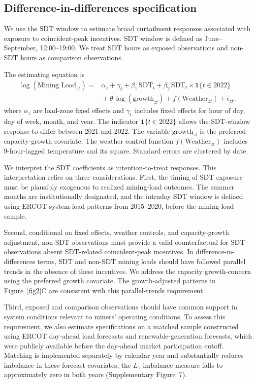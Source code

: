 \documentclass[pdflatex,sn-mathphys-num]{sn-jnl}%
\theoremstyle{thmstyleone}%
\theoremstyle{thmstyletwo}%
\theoremstyle{thmstylethree}%
\begin{document}
\subsection*{Difference-in-differences specification}
We use the SDT window to estimate broad curtailment responses associated with exposure to coincident-peak incentives. SDT window is defined as June--September, 12{:}00--19{:}00. We treat SDT hours as exposed observations and non-SDT hours as comparison observations.

The estimating equation is
\begin{equation}
\label{eq:did_main}
\begin{aligned}
\log(\text{Mining Load}_{zt})
= {} & \alpha_z + \gamma_t
+ \beta_1 \,\text{SDT}_{t}
+ \beta_2 \,\text{SDT}_{t} \times \mathbf{1}\{t \in 2022\} \\
& {} +  \theta\,\log\left(\text{growth}_{zt}\right)
+ f(\text{Weather}_{zt})
+ \epsilon_{zt},
\end{aligned}
\end{equation}
where $\alpha_z$ are load-zone fixed effects and $\gamma_t$ includes fixed effects for hour of day, day of week, month, and year. The indicator $\mathbf{1}\{t \in 2022\}$ allows the SDT-window response to differ between 2021 and 2022. The variable $\text{growth}_{zt}$ is the preferred capacity-growth covariate. The weather control function $f(\text{Weather}_{zt})$ includes 9-hour-lagged temperature and its square. Standard errors are clustered by date.

We interpret the SDT coefficients as intention-to-treat responses. This interpretation relies on three considerations. First, the timing of SDT exposure must be plausibly exogenous to realized mining-load outcomes. The summer months are institutionally designated, and the intraday SDT window is defined using ERCOT system-load patterns from 2015--2020, before the mining-load sample.

Second, conditional on fixed effects, weather controls, and capacity-growth adjustment, non-SDT observations must provide a valid counterfactual for SDT observations absent SDT-related coincident-peak incentives. In difference-in-differences terms, SDT and non-SDT mining loads should have followed parallel trends in the absence of these incentives. We address the capacity growth-concern using the preferred growth covariate. The growth-adjusted patterns in Figure~\ref{fig2}C are consistent with this parallel-trends requirement.

Third, exposed and comparison observations should have common support in system conditions relevant to miners' operating conditions. To assess this requirement, we also estimate specifications on a matched sample constructed using ERCOT day-ahead load forecasts and renewable-generation forecasts, which were publicly available before the day-ahead market participation cutoff. Matching is implemented separately by calendar year and substantially reduces imbalance in these forecast covariates; the $L_1$ imbalance measure falls to approximately zero in both years (Supplementary Figure~7).
\end{document}
